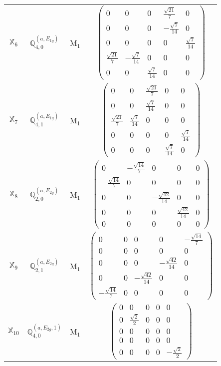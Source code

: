 \documentclass[fleqn,10pt,landscape]{article}
\begin{document}
\begin{itemize}
\begin{center}
\begin{longtable}{c|c|c|c}
$ \mathbb{X}_{6} $ & $\mathbb{Q}_{4,0}^{(a,E_{1g})}$ & M$_{1}$ & $\begin{pmatrix} 0 & 0 & 0 & \frac{\sqrt{21}}{7} & 0 \\ 0 & 0 & 0 & - \frac{\sqrt{7}}{14} & 0 \\ 0 & 0 & 0 & 0 & \frac{\sqrt{7}}{14} \\ \frac{\sqrt{21}}{7} & - \frac{\sqrt{7}}{14} & 0 & 0 & 0 \\ 0 & 0 & \frac{\sqrt{7}}{14} & 0 & 0 \end{pmatrix}$ \\
$ \mathbb{X}_{7} $ & $\mathbb{Q}_{4,1}^{(a,E_{1g})}$ & M$_{1}$ & $\begin{pmatrix} 0 & 0 & \frac{\sqrt{21}}{7} & 0 & 0 \\ 0 & 0 & \frac{\sqrt{7}}{14} & 0 & 0 \\ \frac{\sqrt{21}}{7} & \frac{\sqrt{7}}{14} & 0 & 0 & 0 \\ 0 & 0 & 0 & 0 & \frac{\sqrt{7}}{14} \\ 0 & 0 & 0 & \frac{\sqrt{7}}{14} & 0 \end{pmatrix}$ \\
$ \mathbb{X}_{8} $ & $\mathbb{Q}_{2,0}^{(a,E_{2g})}$ & M$_{1}$ & $\begin{pmatrix} 0 & - \frac{\sqrt{14}}{7} & 0 & 0 & 0 \\ - \frac{\sqrt{14}}{7} & 0 & 0 & 0 & 0 \\ 0 & 0 & - \frac{\sqrt{42}}{14} & 0 & 0 \\ 0 & 0 & 0 & \frac{\sqrt{42}}{14} & 0 \\ 0 & 0 & 0 & 0 & 0 \end{pmatrix}$ \\
$ \mathbb{X}_{9} $ & $\mathbb{Q}_{2,1}^{(a,E_{2g})}$ & M$_{1}$ & $\begin{pmatrix} 0 & 0 & 0 & 0 & - \frac{\sqrt{14}}{7} \\ 0 & 0 & 0 & 0 & 0 \\ 0 & 0 & 0 & - \frac{\sqrt{42}}{14} & 0 \\ 0 & 0 & - \frac{\sqrt{42}}{14} & 0 & 0 \\ - \frac{\sqrt{14}}{7} & 0 & 0 & 0 & 0 \end{pmatrix}$ \\
$ \mathbb{X}_{10} $ & $\mathbb{Q}_{4,0}^{(a,E_{2g},1)}$ & M$_{1}$ & $\begin{pmatrix} 0 & 0 & 0 & 0 & 0 \\ 0 & \frac{\sqrt{2}}{2} & 0 & 0 & 0 \\ 0 & 0 & 0 & 0 & 0 \\ 0 & 0 & 0 & 0 & 0 \\ 0 & 0 & 0 & 0 & - \frac{\sqrt{2}}{2} \end{pmatrix}$ \\

\end{longtable}
\end{center}
\end{itemize}
\end{document}
